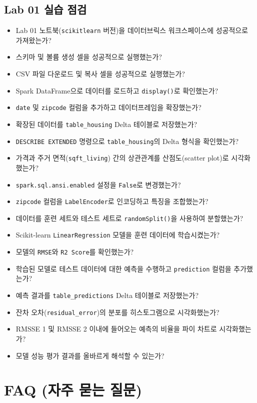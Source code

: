 \documentclass[11pt,a4paper]{article}
\theoremstyle{definition}
\newcommand{\code}[1]{\texttt{#1}}
\begin{document}
\subsection{Lab 01 실습 점검}
\begin{itemize}
    \item [ ] Lab 01 노트북(\code{scikitlearn} 버전)을 데이터브릭스 워크스페이스에 성공적으로 가져왔는가?
    \item [ ] 스키마 및 볼륨 생성 셀을 성공적으로 실행했는가?
    \item [ ] CSV 파일 다운로드 및 복사 셀을 성공적으로 실행했는가?
    \item [ ] Spark DataFrame으로 데이터를 로드하고 \code{display()}로 확인했는가?
    \item [ ] \code{date} 및 \code{zipcode} 컬럼을 추가하고 데이터프레임을 확장했는가?
    \item [ ] 확장된 데이터를 \code{table_housing} Delta 테이블로 저장했는가?
    \item [ ] \code{DESCRIBE EXTENDED} 명령으로 \code{table_housing}의 Delta 형식을 확인했는가?
    \item [ ] 가격과 주거 면적(\code{sqft_living}) 간의 상관관계를 산점도(scatter plot)로 시각화했는가?
    \item [ ] \code{spark.sql.ansi.enabled} 설정을 \code{False}로 변경했는가?
    \item [ ] \code{zipcode} 컬럼을 \code{LabelEncoder}로 인코딩하고 특징을 조합했는가?
    \item [ ] 데이터를 훈련 세트와 테스트 세트로 \code{randomSplit()}을 사용하여 분할했는가?
    \item [ ] Scikit-learn \code{LinearRegression} 모델을 훈련 데이터에 학습시켰는가?
    \item [ ] 모델의 \code{RMSE}와 \code{R2 Score}를 확인했는가?
    \item [ ] 학습된 모델로 테스트 데이터에 대한 예측을 수행하고 \code{prediction} 컬럼을 추가했는가?
    \item [ ] 예측 결과를 \code{table_predictions} Delta 테이블로 저장했는가?
    \item [ ] 잔차 오차(\code{residual_error})의 분포를 히스토그램으로 시각화했는가?
    \item [ ] RMSSE 1 및 RMSSE 2 이내에 들어오는 예측의 비율을 파이 차트로 시각화했는가?
    \item [ ] 모델 성능 평가 결과를 올바르게 해석할 수 있는가?
\end{itemize}

\newpage
\section{FAQ (자주 묻는 질문)}
\end{document}
